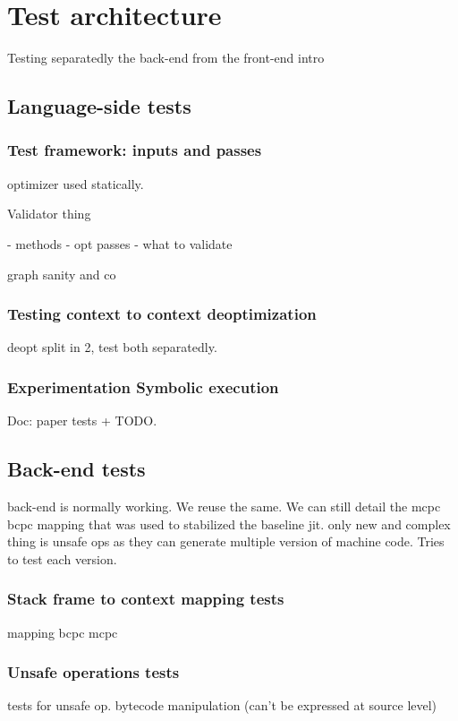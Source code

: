 \documentclass[a4paper,12pt,twoside]{../includes/ThesisStyle}
\begin{document}
\fi

\chapter{Test architecture}
\label{chap:tests}
\minitoc

Testing separatedly the back-end from the front-end intro

\section{Language-side tests}

\subsection{Test framework: inputs and passes}

optimizer used statically.

Validator thing

- methods
- opt passes
- what to validate

graph sanity and co

\subsection{Testing context to context deoptimization}

deopt split in 2, test both separatedly.

\subsection{Experimentation Symbolic execution}

Doc: paper tests + TODO.

\section{Back-end tests}

back-end is normally working. We reuse the same. We can still detail the mcpc bcpc mapping that was used to stabilized the baseline jit. only new and complex thing is unsafe ops as they can generate multiple version of machine code. Tries to test each version.

\subsection{Stack frame to context mapping tests}

mapping bcpc mcpc

\subsection{Unsafe operations tests}

tests for unsafe op. bytecode manipulation (can't be expressed at source level)





\ifx\wholebook\relax\else
    
\end{document}
